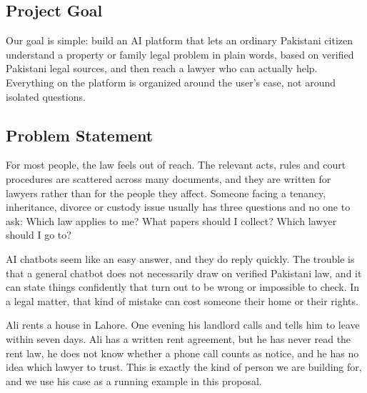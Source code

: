 \documentclass[12pt,a4paper]{report}
\begin{document}
\subsection{Project Goal}
Our goal is simple: build an AI platform that lets an ordinary Pakistani citizen understand a property or family legal problem in plain words, based on verified Pakistani legal sources, and then reach a lawyer who can actually help. Everything on the platform is organized around the user's case, not around isolated questions.

\subsection{Problem Statement}
For most people, the law feels out of reach. The relevant acts, rules and court procedures are scattered across many documents, and they are written for lawyers rather than for the people they affect. Someone facing a tenancy, inheritance, divorce or custody issue usually has three questions and no one to ask: Which law applies to me? What papers should I collect? Which lawyer should I go to?

AI chatbots seem like an easy answer, and they do reply quickly. The trouble is that a general chatbot does not necessarily draw on verified Pakistani law, and it can state things confidently that turn out to be wrong or impossible to check. In a legal matter, that kind of mistake can cost someone their home or their rights.

\begin{example}
Ali rents a house in Lahore. One evening his landlord calls and tells him to leave within seven days. Ali has a written rent agreement, but he has never read the rent law, he does not know whether a phone call counts as notice, and he has no idea which lawyer to trust. This is exactly the kind of person we are building for, and we use his case as a running example in this proposal.
\end{example}
\end{document}
